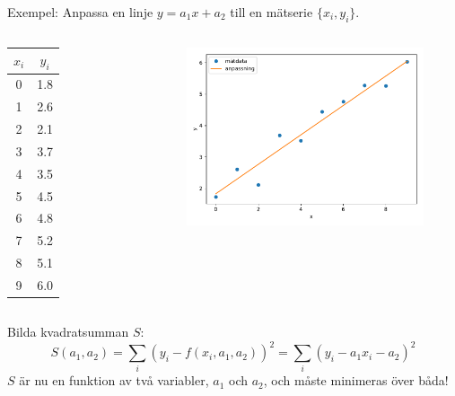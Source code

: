 \documentclass[9pt]{beamer}
\begin{document}
    \begin{frame}
        Exempel: Anpassa en linje $y=a_1x + a_2$ till en mätserie $\{x_i, y_i\}$.
        \begin{columns}
            \begin{table}[]
                \centering
                \begin{tabular}{c|c}
                    $x_i$ & $y_i$   \\ \hline
                    0 & 1.8 \\
                    1 & 2.6 \\
                    2 & 2.1 \\
                    3 & 3.7 \\
                    4 & 3.5 \\
                    5 & 4.5 \\
                    6 & 4.8 \\
                    7 & 5.2 \\
                    8 & 5.1 \\
                    9 & 6.0
                \end{tabular}
            \end{table}
            \begin{figure}
                \centering
                \includegraphics[scale=0.4]{anpassning2.pdf}
            \end{figure}
        \end{columns}
        
        Bilda kvadratsumman $S$:
        \begin{equation*}
            S(a_1, a_2) = \sum_i (y_i - f(x_i,a_1,a_2))^2 = \sum_i (y_i - a_1x_i - a_2)^2
        \end{equation*}
        $S$ är nu en funktion av två variabler, $a_1$ och $a_2$, och måste minimeras över båda!
    \end{frame}
    
\end{document}

